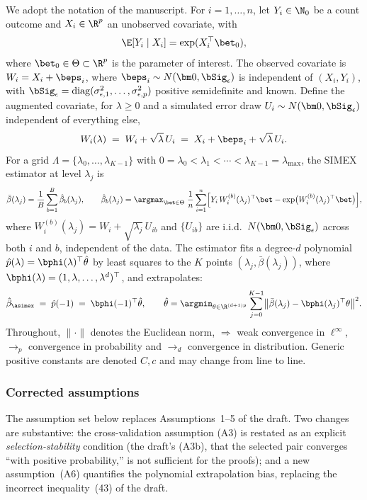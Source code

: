 We adopt the notation of the manuscript. For $i=1,\dots,n$, let
$Y_i\in\N_0$ be a count outcome and $X_i\in\R^p$ an unobserved covariate,
with
\[
  \E[Y_i\mid X_i]=\exp(X_i^\top\bet_0),
\]
where $\bet_0\in\Theta\subset\R^p$ is the parameter of interest. The observed
covariate is $W_i=X_i+\beps_i$, where $\beps_i\sim N(\bm 0,\bSig_\epsilon)$
is independent of $(X_i,Y_i)$, with $\bSig_\epsilon=\operatorname{diag}
(\sigma^2_{\epsilon,1},\dots,\sigma^2_{\epsilon,p})$ positive semidefinite
and known. Define the augmented covariate, for $\lambda\ge 0$ and a
simulated error draw $U_i\sim N(\bm 0,\bSig_\epsilon)$ independent of
everything else,
\[
  W_i(\lambda) \;=\; W_i+\sqrt{\lambda}\,U_i \;=\; X_i+\beps_i+\sqrt{\lambda}\,U_i .
\]
For a grid $\Lambda=\{\lambda_0,\dots,\lambda_{K-1}\}$ with
$0=\lambda_0<\lambda_1<\cdots<\lambda_{K-1}=\lambda_{\max}$, the SIMEX
estimator at level $\lambda_j$ is
\[
  \bar\beta(\lambda_j)=\frac1B\sum_{b=1}^{B}\hat\beta_b(\lambda_j),\qquad
  \hat\beta_b(\lambda_j)=\argmax_{\bet\in\Theta}\;
  \frac1n\sum_{i=1}^{n}\Bigl[Y_i\,W_i^{(b)}(\lambda_j)^\top\bet
  -\exp\bigl(W_i^{(b)}(\lambda_j)^\top\bet\bigr)\Bigr],
\]
where $W_i^{(b)}(\lambda_j)=W_i+\sqrt{\lambda_j}\,U_{ib}$ and
$\{U_{ib}\}$ are i.i.d.\ $N(\bm 0,\bSig_\epsilon)$ across both $i$ and $b$,
independent of the data. The \asimex{} estimator fits a degree-$d$
polynomial $\hat p(\lambda)=\bphi(\lambda)^\top\hat\theta$ by least squares
to the $K$ points $(\lambda_j,\bar\beta(\lambda_j))$, where
$\bphi(\lambda)=(1,\lambda,\dots,\lambda^d)^\top$, and extrapolates:
\[
  \hat\beta_{\asimex} \;=\; \hat p(-1)\;=\;\bphi(-1)^\top\hat\theta,
  \qquad
  \hat\theta=\argmin_{\theta\in\R^{(d+1)p}}
  \sum_{j=0}^{K-1}\bigl\|\bar\beta(\lambda_j)-\bphi(\lambda_j)^\top\theta\bigr\|^2 .
\]
Throughout, $\|\cdot\|$ denotes the Euclidean norm, $\Rightarrow$ weak
convergence in $\ell^\infty$, $\rightarrow_p$ convergence in probability and
$\rightarrow_d$ convergence in distribution. Generic positive constants are
denoted $C,c$ and may change from line to line.

\subsubsection{Corrected assumptions}\label{app:sec:assumptions}

The assumption set below replaces Assumptions~1--5 of the draft. Two changes
are substantive: the cross-validation assumption (A3) is restated as an
explicit \emph{selection-stability} condition (the draft's (A3b), that the
selected pair converges ``with positive probability,'' is not sufficient for
the proofs); and a new assumption~(A6) quantifies the polynomial
extrapolation bias, replacing the incorrect inequality~(43) of the draft.

